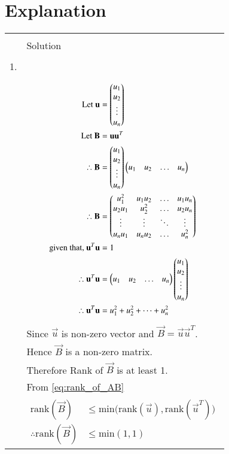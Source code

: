 \documentclass[journal,12pt]{IEEEtran}
\begin{document}
\section{\textbf{Explanation}}
\renewcommand{\thetable}{2}
\begin{longtable}{|l|l|}
\hline
\multirow{3}{*}{} & \\
Statement&Solution\\
\hline
&\\
1.&\\
&\parbox{10cm}{\begin{align*}
    \mbox{Let }\mathbf{u}&=\begin{pmatrix}u_1\\u_2\\\vdots\\u_n\end{pmatrix}\\
    \mbox{Let }\mathbf{B}&=\mathbf{u}\mathbf{u}^T\\
    \therefore \mathbf{B}&=\begin{pmatrix}u_1\\u_2\\\vdots\\u_n\end{pmatrix}\begin{pmatrix}u_1&u_2&\dots&u_n\end{pmatrix}\\
    \therefore \mathbf{B}&=\begin{pmatrix}u_1^2&u_1u_2&\dots&u_1u_n\\
    u_2u_1&u_2^2&\dots&u_2u_n\\
    \vdots&\vdots&\ddots&\vdots\\
    u_nu_1&u_nu_2&\dots&u_n^2\end{pmatrix}\\
    \mbox{given that, }\mathbf{u}^T\mathbf{u}&=1\\
    \therefore \mathbf{u}^T\mathbf{u}&=\begin{pmatrix}u_1&u_2&\dots&u_n\end{pmatrix}\begin{pmatrix}u_1\\u_2\\\vdots\\u_n\end{pmatrix}\\
    \therefore \mathbf{u}^T\mathbf{u}&=u_1^2+u_2^2+\dots+u_n^2
\end{align*}}\\
&Since $\vec{u}$ is non-zero vector and $\vec{B}=\vec{u}\vec{u}^T$.\\
&Hence $\vec{B}$ is a non-zero matrix.\\
&Therefore Rank of $\vec{B}$ is at least 1.\\
&From \eqref{eq:rank_of_AB}\\
&\parbox{8cm}{\begin{align*}
    \mbox{rank}(\vec{B})&\leq\mbox{min(rank}(\vec{u}),\mbox{rank}(\vec{u}^T))\\
    \therefore\mbox{rank}(\vec{B})&\leq\mbox{min}(1,1)
\end{align*}}\\

\end{longtable}
\end{document}
